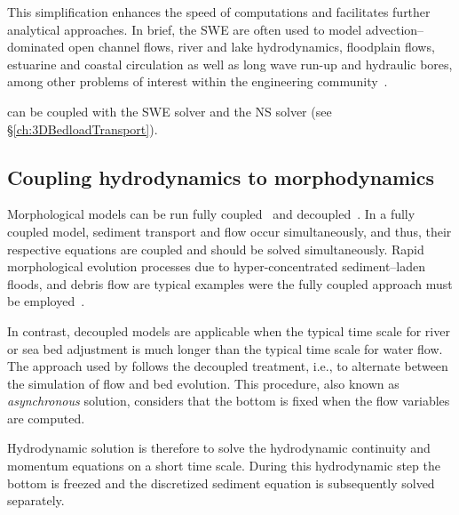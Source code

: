 This simplification enhances the speed of computations and
facilitates further analytical approaches. In brief, the SWE are often
used to model advection--dominated open channel flows, river and lake
hydrodynamics, floodplain flows, estuarine and coastal circulation as well
as long wave run-up and hydraulic bores, among
other problems of interest within the engineering community~\cite{Vreugdenhil:94}. 

\sisyphe{} can be coupled with the SWE solver  and the NS solver  (see \S\ref{ch:3DBedloadTransport}). 

\subsection{Coupling hydrodynamics to morphodynamics}
Morphological models can be run fully coupled~\cite{cao02} and decoupled~\cite{vriend87}. In a fully coupled model, sediment
transport and flow occur simultaneously, and thus, their respective
equations are coupled and should be solved simultaneously. Rapid morphological evolution processes due
to hyper-concentrated sediment--laden floods, and debris flow are typical
examples were the fully coupled approach must be employed~\cite{Frac02}.

In contrast, decoupled models are applicable when the typical time scale for river or sea bed adjustment 
is much longer than the typical time scale for water flow. The approach used by \sisyphe{} follows the decoupled treatment, i.e., to alternate between the simulation of flow and bed evolution. This procedure, also known as \textit{asynchronous} solution, considers that the bottom is fixed when the flow variables are computed.

Hydrodynamic solution is therefore to solve the hydrodynamic continuity and momentum equations on a short time scale. 
During this hydrodynamic step the bottom is freezed and the discretized sediment equation is subsequently solved separately.



